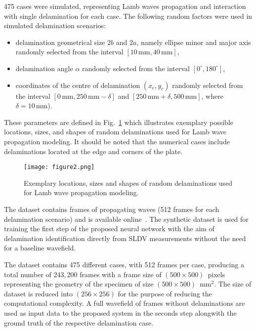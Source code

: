 475 cases were simulated, representing Lamb waves propagation and interaction 
with single delamination for each case. 
The following random factors were used in simulated delamination scenarios:
\begin{itemize}
	\item delamination geometrical size	\(2b\) and \(2a\), namely ellipse minor 
	and major axis randomly selected from the interval \newline \(\left[10 \, 
	\textrm{mm}, 40\, \textrm{mm}\right]\),
	\item delamination angle \(\alpha\) randomly selected from the interval \( 
	\left[ 0^{\circ}, 180^{\circ} \right]\),
	\item coordinates of the centre of delamination \((x_c,y_c)\) randomly 
	selected from the interval \(\left[0\, \textrm{mm}, 250\, \textrm{mm} 
	-\delta \right]\) and \newline \( \left[250\, \textrm{mm}+\delta, 500\, 
	\textrm{mm} 
	\right] \), where \(\delta = 10\, \textrm{mm}\)).
\end{itemize}
These parameters are defined in Fig.~\ref{fig:random_delaminations} which 
illustrates exemplary possible locations, sizes, and shapes of random 
delaminations used for Lamb wave propagation modeling.
It should be noted that the numerical cases include delaminations located at 
the edge and corners of the plate.
\begin{figure} [h!]
	\begin{center}
		\texttt{[image: figure2.png]}
	\end{center}
	\caption{Exemplary locations, sizes and shapes of random delaminations used 
		for Lamb wave propagation modeling.} 
	\label{fig:random_delaminations}
\end{figure}

The dataset contains frames of propagating waves (512  frames for each 
delamination scenario) and is available online~\cite{kudela_pawel_2021_5414555}.
The synthetic dataset is used for training the first step of the proposed 
neural network with the aim of delamination identification directly from SLDV 
measurements without the need for a baseline wavefield.

The dataset contains 475 different cases, with 512 frames 
per case, producing a total number of 243,\,200 frames with a frame size of 
\((500\times500)\)~pixels representing the geometry of the specimen of size 
\((500\times500)\)~mm\(^{2}\).
The size of dataset is reduced into \((256\times256)\) for the purpose of 
reducing the computational complexity.
A full wavefield of frames without delaminations are used as input data to the 
proposed system in the seconds step alongwith the ground truth of the 
respective delamination case.
